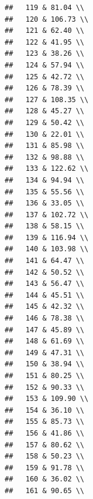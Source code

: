 \documentclass{article}\usepackage[]{graphicx}\usepackage[]{color}
\makeatletter
\newenvironment{kframe}{%
 \def\at@end@of@kframe{}%
 \ifinner\ifhmode%
  \def\at@end@of@kframe{\end{minipage}}%
  \begin{minipage}{\columnwidth}%
 \fi\fi%
 \def\FrameCommand##1{\hskip\@totalleftmargin \hskip-\fboxsep
 \colorbox{shadecolor}{##1}\hskip-\fboxsep
     \hskip-\linewidth \hskip-\@totalleftmargin \hskip\columnwidth}%
 \MakeFramed {\advance\hsize-\width
   \@totalleftmargin\z@ \linewidth\hsize
   \@setminipage}}%
 {\par\unskip\endMakeFramed%
 \at@end@of@kframe}
\newenvironment{knitrout}{}{} %
\makeatother
\begin{document}
\begin{knitrout}
\begin{kframe}
\begin{verbatim}
##   119 & 81.04 \\ 
##   120 & 106.73 \\ 
##   121 & 62.40 \\ 
##   122 & 41.95 \\ 
##   123 & 38.26 \\ 
##   124 & 57.94 \\ 
##   125 & 42.72 \\ 
##   126 & 78.39 \\ 
##   127 & 108.35 \\ 
##   128 & 45.27 \\ 
##   129 & 50.42 \\ 
##   130 & 22.01 \\ 
##   131 & 85.98 \\ 
##   132 & 98.88 \\ 
##   133 & 122.62 \\ 
##   134 & 94.94 \\ 
##   135 & 55.56 \\ 
##   136 & 33.05 \\ 
##   137 & 102.72 \\ 
##   138 & 58.15 \\ 
##   139 & 116.94 \\ 
##   140 & 103.98 \\ 
##   141 & 64.47 \\ 
##   142 & 50.52 \\ 
##   143 & 56.47 \\ 
##   144 & 45.51 \\ 
##   145 & 42.32 \\ 
##   146 & 78.38 \\ 
##   147 & 45.89 \\ 
##   148 & 61.69 \\ 
##   149 & 47.31 \\ 
##   150 & 38.94 \\ 
##   151 & 80.25 \\ 
##   152 & 90.33 \\ 
##   153 & 109.90 \\ 
##   154 & 36.10 \\ 
##   155 & 85.73 \\ 
##   156 & 41.86 \\ 
##   157 & 80.62 \\ 
##   158 & 50.23 \\ 
##   159 & 91.78 \\ 
##   160 & 36.02 \\ 
##   161 & 90.65 \\ 

\end{verbatim}
\end{kframe}
\end{knitrout}
\end{document}
